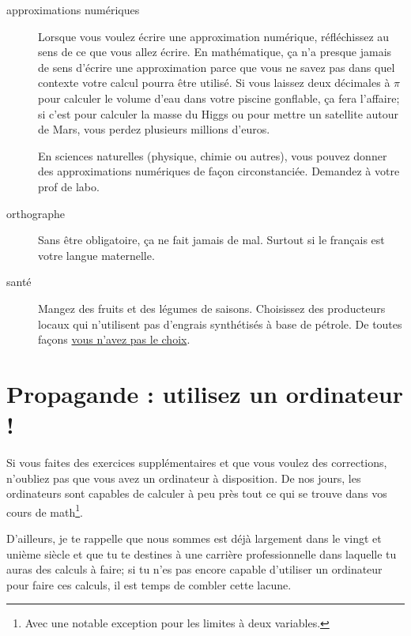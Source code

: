 \begin{description}
    \item[approximations numériques] Lorsque vous voulez écrire une approximation numérique, réfléchissez au sens de ce que vous allez écrire. En mathématique, ça n'a presque jamais de sens d'écrire une approximation parce que vous ne savez pas dans quel contexte votre calcul pourra être utilisé. Si vous laissez deux décimales à \( \pi\) pour calculer le volume d'eau dans votre piscine gonflable, ça fera l'affaire; si c'est pour calculer la masse du Higgs ou pour mettre un satellite autour de Mars, vous perdez plusieurs millions d'euros.

        En sciences naturelles (physique, chimie ou autres), vous pouvez donner des approximations numériques de façon circonstanciée. Demandez à votre prof de labo.

    \item[orthographe] Sans être obligatoire, ça ne fait jamais de mal. Surtout si le français est votre langue maternelle.
    \item[santé] Mangez des fruits et des légumes de saisons. Choisissez des producteurs locaux qui n'utilisent pas d'engrais synthétisés à base de pétrole. De toutes façons \href{http://www.energybulletin.net/node/51306}{vous n'avez pas le choix}.

\end{description}

\section{Propagande : utilisez un ordinateur !}

Si vous faites des exercices supplémentaires et que vous voulez des corrections, n'oubliez pas que vous avez un ordinateur à disposition. De nos jours, les ordinateurs sont capables de calculer à peu près tout ce qui se trouve dans vos cours de math\footnote{Avec une notable exception pour les limites à deux variables.}.

D'ailleurs, je te rappelle que nous sommes est déjà largement dans le vingt et unième siècle et que tu te destines à une carrière professionnelle dans laquelle tu auras des calculs à faire; si tu n'es pas encore capable d'utiliser un ordinateur pour faire ces calculs, il est temps de combler cette lacune.

